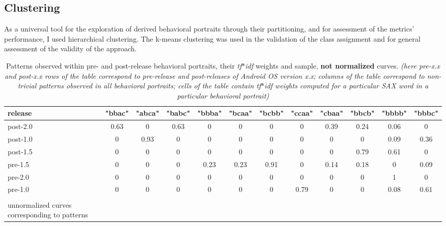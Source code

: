 \documentclass[conference]{worldcomp}
\begin{document}
\subsection{Clustering} \label{clustering}
As a universal tool for the exploration of derived behavioral portraits through their partitioning, 
and for assessment of the metrics' performance, I used hierarchical clustering. The k-means
clustering was used in the validation of the class assignment and for general assessment of 
the validity of the approach.

\begin{table}
  \caption{Patterns observed within pre- and post-release behavioral portraits, their \textit{tf$\ast$idf} weights and sample, \textbf{not normalized} curves.
  \textit{(here pre-\textit{x.x} and post-\textit{x.x} rows of the table correspond to pre-release and post-releases of Android OS version x.x; 
   columns of the table correspond to non-trivial patterns observed in all behavioral portraits; cells of the table contain \textit{tf$\ast$idf} 
   weights computed for a particular SAX word in a particular behavioral portrait)}}
  \label{tab:tokens}
  \begin{tabular}{ | b{1.5cm} | c | c | c | c | c | c | c | c | c | c | c |}
  \hline
release & "bbac" & "abca" & "babc" & "bbba" & "bcaa" & "bcbb" & "ccaa" & "cbaa" & "bbcb" & "bbbb" & "bbbc"\\ 
  \hline
 post-2.0 & 0.63 & 0 & 0.63 & 0 & 0 & 0 & 0 & 0.39 & 0.24 & 0.06 & 0\\ 
 post-1.0 & 0 & 0.93 & 0 & 0 & 0 & 0 & 0 & 0 & 0 & 0.09 & 0.36\\ 
 post-1.5 & 0 & 0 & 0 & 0 & 0 & 0 & 0 & 0 & 0.79 & 0.61 & 0\\ 
 pre-1.5 & 0 & 0 & 0 & 0.23 & 0.23 & 0.91 & 0 & 0.14 & 0.18 & 0 & 0.09\\ 
 pre-2.0 & 0 & 0 & 0 & 0 & 0 & 0 & 0 & 0 & 0 & 1 & 0\\ 
 pre-1.0 & 0 & 0 & 0 & 0 & 0 & 0 & 0.79 & 0 & 0 & 0.08 & 0.61\\
 \hline 
 &  &  &  &  &  &  & &  &  &  & \\
 unnormalized curves corresponding to patterns &

\end{tabular}
\end{table}
\end{document}
